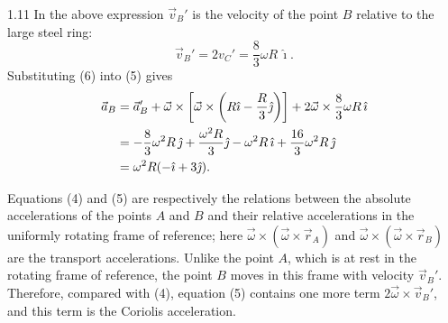 \begin{solution}{1.11}
In the above expression $\vec{v}_B'$ is the velocity of the point $B$ relative to the large steel ring:
\begin{equation}
\vec{v}_B'=2v_C'=\frac{8}{3}\omega R\,\hat{\imath}. \tag{6}
\end{equation}
Substituting (6) into (5) gives
\begin{align}
\vec{a}_B&=\vec{a}_B'+\vec{\omega}\times\left[\vec{\omega}\times\left(R\hat{\imath}-\frac{R}{3}\hat{\jmath}\right)\right]+2\vec{\omega}\times\frac{8}{3}\omega R\,\hat{\imath}\notag\\
&=-\frac{8}{3}\omega^2R\,\hat{\jmath}+\frac{\omega^2R}{3}\hat{\jmath}-\omega^2R\,\hat{\imath}+\frac{16}{3}\omega^2R\,\hat{\jmath}\notag\\
&=\omega^2R(-\hat{\imath}+3\hat{\jmath}).\notag
\end{align}

\begin{commentary}
Equations (4) and (5) are respectively the relations between the absolute accelerations of the points $A$ and $B$ and their relative accelerations in the uniformly rotating frame of reference; here $\vec{\omega}\times(\vec{\omega}\times\vec{r}_A)$ and $\vec{\omega}\times(\vec{\omega}\times\vec{r}_B)$ are the transport accelerations. Unlike the point $A$, which is at rest in the rotating frame of reference, the point $B$ moves in this frame with velocity $\vec{v}_B'$. Therefore, compared with (4), equation (5) contains one more term $2\vec{\omega}\times\vec{v}_B'$, and this term is the Coriolis acceleration.
\end{commentary}
\end{solution}


